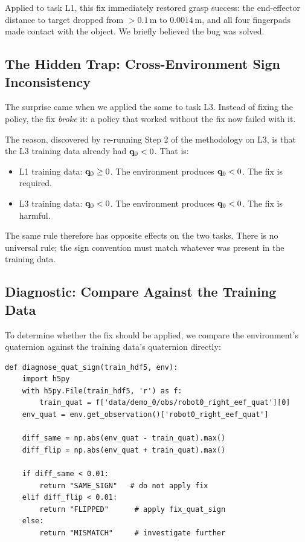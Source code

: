 Applied to task L1, this fix immediately restored grasp success: the end-effector distance to target dropped from $>0.1\,\mathrm{m}$ to $0.0014\,\mathrm{m}$, and all four fingerpads made contact with the object. We briefly believed the bug was solved.

\subsection{The Hidden Trap: Cross-Environment Sign Inconsistency}
\label{sec:quaternion:trap}

The surprise came when we applied the same  to task L3. Instead of fixing the policy, the fix \emph{broke} it: a policy that worked without the fix now failed with it.

The reason, discovered by re-running Step 2 of the methodology on L3, is that the L3 training data already had $\mathbf{q}_0 < 0$. That is:
\begin{itemize}[leftmargin=*,itemsep=2pt]
    \item L1 training data: $\mathbf{q}_0 \geq 0$. The environment produces $\mathbf{q}_0 < 0$. The fix is required.
    \item L3 training data: $\mathbf{q}_0 < 0$. The environment produces $\mathbf{q}_0 < 0$. The fix is harmful.
\end{itemize}

The same  rule therefore has opposite effects on the two tasks. There is no universal rule; the sign convention must match whatever was present in the training data.

\subsection{Diagnostic: Compare Against the Training Data}
\label{sec:quaternion:diagnostic}

To determine whether the fix should be applied, we compare the environment's quaternion against the training data's quaternion directly:

\begin{lstlisting}[caption={Diagnostic: detect sign consistency between env and training data.}]
def diagnose_quat_sign(train_hdf5, env):
    import h5py
    with h5py.File(train_hdf5, 'r') as f:
        train_quat = f['data/demo_0/obs/robot0_right_eef_quat'][0]
    env_quat = env.get_observation()['robot0_right_eef_quat']

    diff_same = np.abs(env_quat - train_quat).max()
    diff_flip = np.abs(env_quat + train_quat).max()

    if diff_same < 0.01:
        return "SAME_SIGN"   # do not apply fix
    elif diff_flip < 0.01:
        return "FLIPPED"      # apply fix_quat_sign
    else:
        return "MISMATCH"     # investigate further
\end{lstlisting}

